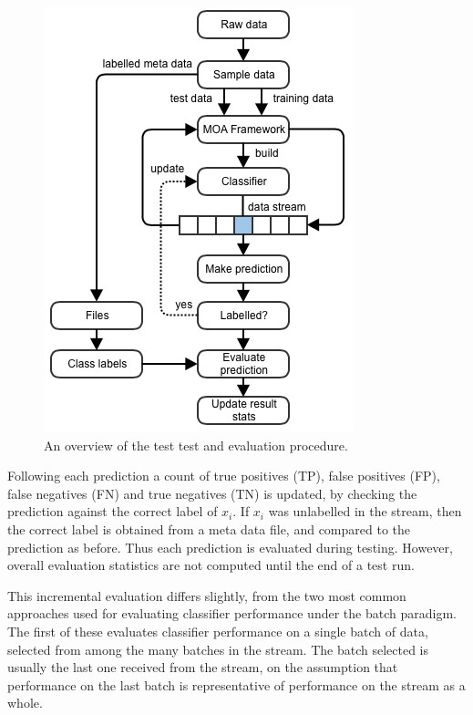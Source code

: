 \documentclass[twoside,a4paper]{refart}
\begin{document}
\begin{figure}[htb]
	\centering
		\includegraphics[keepaspectratio,scale=0.6]{Framework.png}
		\caption[An overview of the test and evaluation procedure.]{An overview of the test test and evaluation procedure.}
		\label{fig:framework}
		\vspace{-1em}
\end{figure}

Following each prediction a count of true positives (TP), false positives (FP), false negatives (FN) and true negatives (TN) is updated, by checking the prediction against the correct label of $x_{i}$. If $x_{i}$ was unlabelled in the stream, then the correct label is obtained from a meta data file, and compared to the prediction as before. Thus each prediction is evaluated during testing. However, overall evaluation statistics are not computed until the end of a test run.

This incremental evaluation differs slightly, from the two most common approaches used for evaluating classifier performance under the batch paradigm. The first of these evaluates classifier performance on a single batch of data, selected from among the many batches in the stream. The batch selected is usually the last one received from the stream, on the assumption that performance on the last batch is representative of performance on the stream as a  whole. 
\end{document}
